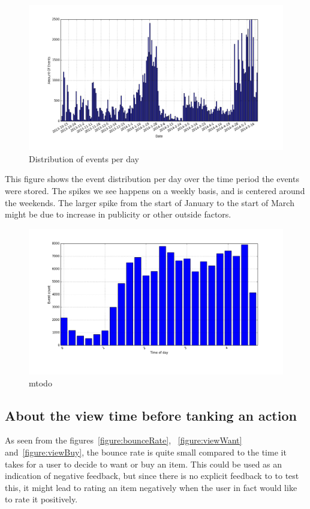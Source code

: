     \begin{figure}[H]
        \includegraphics[width=5in]{image/eventsPerDay.png}
        \centering
        \caption{Distribution of events per day}
    \label{figure:eventOnDaysDist}
    \end{figure}
        This figure shows the event distribution per day over the time period the events were stored.
        The spikes we see happens on a weekly basis, and is centered around the weekends.
        The larger spike from the start of January to the start of March might be due to increase in publicity or other outside factors.


    \begin{figure}[H]
        \includegraphics[width=5in]{image/hrdistribution.png}
        \centering
        \caption{mtodo}
    \label{figure:timeOfDayDistr}
    \end{figure}


\subsection{About the view time before tanking an action}
    As seen from the figures~\ref{figure:bounceRate}, ~\ref{figure:viewWant} and~\ref{figure:viewBuy}, the bounce rate is quite small compared to the time it takes for a user to decide to want or buy an item.
    This could be used as an indication of negative feedback, but since there is no explicit feedback to to test this, it might lead to rating an item negatively when the user in fact would like to rate it positively.


